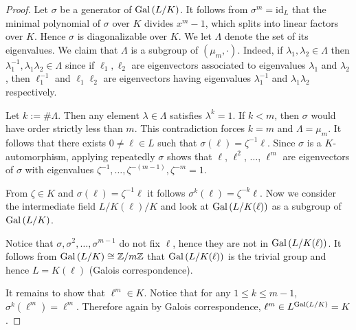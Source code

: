 \documentclass[twoside = false,	%
		headsepline,		%
		parskip = true,
		]{scrbook}						%
\begin{document}
    \begin{proof}
    {\color{blue} Let $\sigma$ be a generator of $\mathrm{Gal}\left( L/K\right)$. It follows from $\sigma^m=\mathrm{id}_L$ that the minimal polynomial of $\sigma$ over $K$ divides $x^m-1$, which splits into linear factors over $K$. Hence $\sigma$ is diagonalizable over $K$. We let $\Lambda$ denote the set of its eigenvalues. We claim that $\Lambda$ is a subgroup of $(\mu_m,\cdot)$. Indeed, if $\lambda_1,\lambda_2\in\Lambda$ then $\lambda_1^{-1},\lambda_1\lambda_2\in\Lambda$ since if $\ell_1,\ell_2$ are eigenvectors associated to eigenvalues $\lambda_1$ and $\lambda_2$, then $\ell_1^{-1}$ and $\ell_1\ell_2$ are eigenvectors having eigenvalues $\lambda_1^{-1}$ and $\lambda_1\lambda_2$ respectively. 
    
    Let $k:=\#\Lambda$. Then any element $\lambda\in\Lambda$ satisfies $\lambda^k=1$. If $k<m$, then $\sigma$ would have order strictly less than $m$. This contradiction forces $k=m$ and $\Lambda=\mu_m$. It follows that there exists $0\neq \ell\in L$ such that $\sigma(\ell)=\zeta^{-1}\ell$. Since $\sigma$ is a $K$-automorphism, applying repeatedly $\sigma$ shows that $\ell$, $\ell^2$, $\ldots$, $\ell^m$ are eigenvectors of $\sigma$ with eigenvalues $\zeta^{-1},\ldots,\zeta^{-(m-1)},\zeta^{-m}=1$.}
        
        From $\zeta \in K$ and $\sigma(\ell) = \zeta^{-1} \ell$ it follows $\sigma^k(\ell) = \zeta^{-k} \ell$. Now we consider the intermediate field $L/K(\ell)/K$ and look at $\mathrm{Gal}\left( L/K(\ell)\right)$ as a subgroup of $\mathrm{Gal}\left( L/K\right)$.
        
        Notice that $\sigma,\sigma^2,\dots,\sigma^{m-1}$ do not fix $\ell$, hence they are not in $\mathrm{Gal}\left( L/K(\ell)\right)$. It follows from $\mathrm{Gal}\left( L/K\right) \cong \mathbb Z/m\mathbb Z$ that $\mathrm{Gal}\left( L/K(\ell)\right)$ is the trivial group and hence $L = K(\ell)$ (Galois correspondence).
        
        It remains to show that $\ell^m \in K$. Notice that for any $1 \leq k \leq m-1$, $\sigma^k(\ell^m) = \ell^m$. Therefore again by Galois correspondence, $\ell^m \in L^{\mathrm{Gal}\left( L/K\right)} = K$.
    \end{proof}
    
\end{document}
